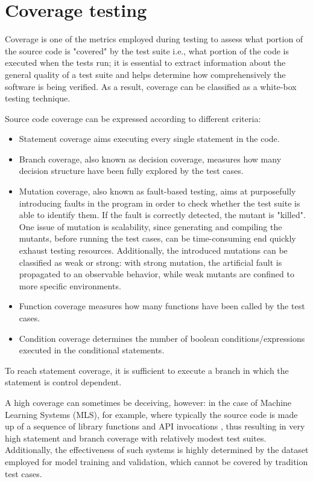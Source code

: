 \section{Coverage testing}
Coverage is one of the metrics employed during testing to assess what portion of the source code is "covered" by the test suite i.e., 
what portion of the code is executed when the tests run; it is essential to extract information about the general quality of a test suite and helps determine how comprehensively the software is being verified. As a result, coverage can be classified as a white-box testing technique.

Source code coverage can be expressed according to different criteria:
\begin {itemize}
    \item Statement coverage aims executing every single statement in the code.
    \item Branch coverage, also known as decision coverage, measures how many decision structure have been fully explored by the test cases.
    \item Mutation coverage, also known as fault-based testing, aims at purposefully introducing faults in the program in order to 
            check whether the test suite is able to identify them. If the fault is correctly detected, the mutant is "killed".
            One issue of mutation is scalability, since generating and compiling the mutants, before running the test cases, can be time-consuming end quickly exhaust testing resources. Additionally, the introduced mutations can be classified as weak or strong: with strong mutation, the artificial fault is propagated to an observable behavior, while weak mutants are confined to more 
            specific environments.
    \item Function coverage measures how many functions have been called by the test cases.
    \item Condition coverage determines the number of boolean conditions/expressions executed in the conditional statements.
\end {itemize}
To reach statement coverage, it is sufficient to execute a branch in which the statement is control dependent.

A high coverage can sometimes be deceiving, however: in the case of Machine Learning Systems (MLS), for example, where typically the source code is made up of a sequence of library functions and API invocations \cite{DBLP:journals/ese/RiccioJSHWT20}, thus resulting in very high statement and branch coverage with relatively modest
test suites. Additionally, the effectiveness of such systems is highly determined by the dataset employed for model training and validation, which cannot be covered by tradition test cases.

